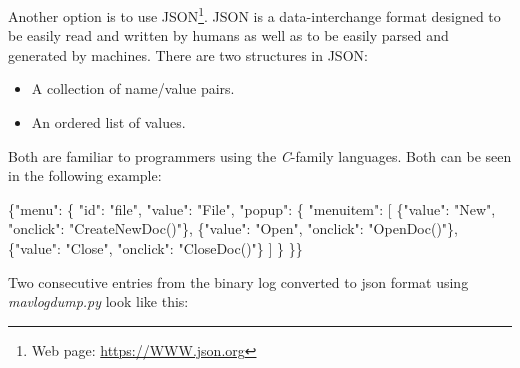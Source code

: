 \documentclass[12pt,oneside]{reedthesis}
\newenvironment{Shaded}{\begin{snugshade}}{\end{snugshade}}
\newcommand{\DataTypeTok}[1]{\textcolor[rgb]{0.13,0.29,0.53}{#1}}
\newcommand{\StringTok}[1]{\textcolor[rgb]{0.31,0.60,0.02}{#1}}
\newcommand{\OtherTok}[1]{\textcolor[rgb]{0.56,0.35,0.01}{#1}}
\newcommand{\FunctionTok}[1]{\textcolor[rgb]{0.00,0.00,0.00}{#1}}
\theoremstyle{definition}
\theoremstyle{definition}
\theoremstyle{definition}
\theoremstyle{remark}
\begin{document}
Another option is to use JSON\footnote{Web page:
  \url{https://WWW.json.org}}. JSON is a data-interchange format
designed to be easily read and written by humans as well as to be easily
parsed and generated by machines. There are two structures in JSON:
\begin{itemize}
\item
  A collection of name/value pairs.
\item
  An ordered list of values.
\end{itemize}
Both are familiar to programmers using the \emph{C}-family languages.
Both can be seen in the following example:
\begin{Shaded}
\begin{Highlighting}[]
\FunctionTok{\{}\DataTypeTok{"menu"}\FunctionTok{:} \FunctionTok{\{}
  \DataTypeTok{"id"}\FunctionTok{:} \StringTok{"file"}\FunctionTok{,}
  \DataTypeTok{"value"}\FunctionTok{:} \StringTok{"File"}\FunctionTok{,}
  \DataTypeTok{"popup"}\FunctionTok{:} \FunctionTok{\{}
    \DataTypeTok{"menuitem"}\FunctionTok{:} \OtherTok{[}
      \FunctionTok{\{}\DataTypeTok{"value"}\FunctionTok{:} \StringTok{"New"}\FunctionTok{,} \DataTypeTok{"onclick"}\FunctionTok{:} \StringTok{"CreateNewDoc()"}\FunctionTok{\}}\OtherTok{,}
      \FunctionTok{\{}\DataTypeTok{"value"}\FunctionTok{:} \StringTok{"Open"}\FunctionTok{,} \DataTypeTok{"onclick"}\FunctionTok{:} \StringTok{"OpenDoc()"}\FunctionTok{\}}\OtherTok{,}
      \FunctionTok{\{}\DataTypeTok{"value"}\FunctionTok{:} \StringTok{"Close"}\FunctionTok{,} \DataTypeTok{"onclick"}\FunctionTok{:} \StringTok{"CloseDoc()"}\FunctionTok{\}}
    \OtherTok{]}
  \FunctionTok{\}}
\FunctionTok{\}\}}
\end{Highlighting}
\end{Shaded}
Two consecutive entries from the binary log converted to json format
using \emph{mavlogdump.py} look like this:
\end{document}
